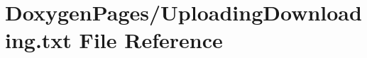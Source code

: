 \hypertarget{_uploading_downloading_8txt}{\section{Doxygen\-Pages/\-Uploading\-Downloading.txt File Reference}
\label{_uploading_downloading_8txt}
}

